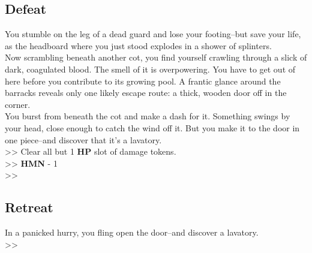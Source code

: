 \subsection*{Defeat}
You stumble on the leg of a dead guard and lose your footing--but save your life, as the headboard where you just stood explodes in a shower of splinters.\\

Now scrambling beneath another cot, you find yourself crawling through a slick of dark, coagulated blood. The smell of it is overpowering. You have to get out of here before you contribute to its growing pool. A frantic glance around the barracks reveals only one likely escape route: a thick, wooden door off in the corner.\\

You burst from beneath the cot and make a dash for it. Something swings by your head, close enough to catch the wind off it. But you make it to the door in one piece--and discover that it’s a lavatory.\\

>> Clear all but 1 \textbf{HP} slot of damage tokens.\\
>> \textbf{HMN} - 1\\
>> 

\subsection*{Retreat}
In a panicked hurry, you fling open the door--and discover a lavatory.\\

>> 